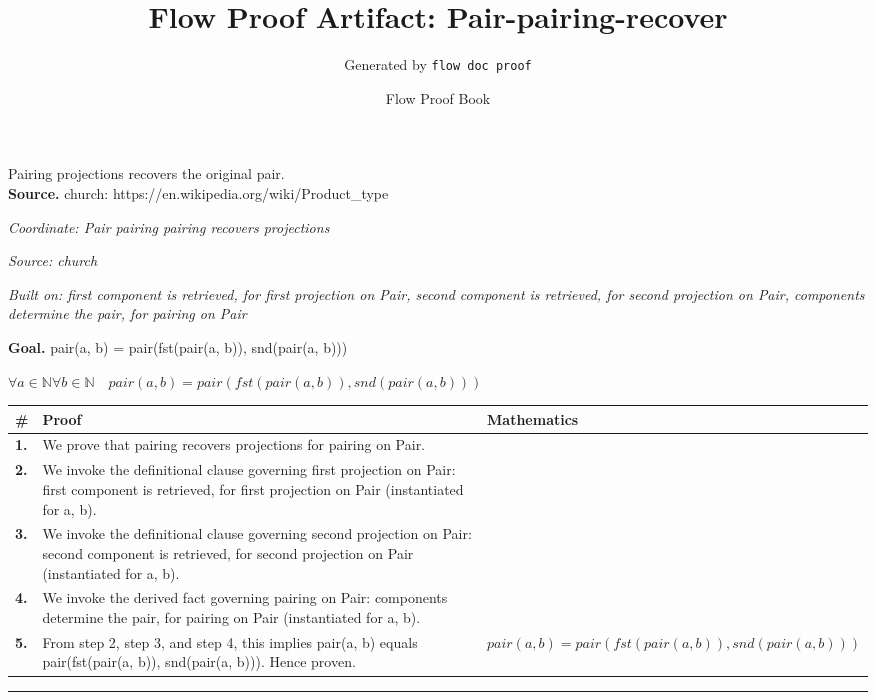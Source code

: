 \documentclass[11pt]{article}
\title{Flow Proof Artifact: Pair-pairing-recover}
\author{Generated by \texttt{flow doc proof}}
\date{Flow Proof Book}
\theoremstyle{definition}
\begin{document}
\maketitle
Pairing projections recovers the original pair.\\[0.5em]
\textbf{Source.} church: https://en.wikipedia.org/wiki/Product\_type\\[0.5em]
\bigskip
{}\par
\smallskip\noindent\textit{Coordinate: Pair \cdot pairing \cdot pairing recovers projections}\par
\smallskip\noindent\textit{Source: church}\par
\smallskip\noindent\textit{Built on: first component is retrieved, for first projection on Pair, second component is retrieved, for second projection on Pair, components determine the pair, for pairing on Pair}\par
\medskip
\noindent\textbf{Goal.} pair(a, b) = pair(fst(pair(a, b)), snd(pair(a, b)))\par
\noindent$\displaystyle \forall a \in \mathbb{N} \forall b \in \mathbb{N}\quad pair(a, b) = pair(fst(pair(a, b)), snd(pair(a, b)))$\par
\medskip
\noindent
\begin{tabular}{@{} >{\raggedright\arraybackslash}p{} >{\raggedright\arraybackslash}p{} >{\raggedleft\arraybackslash}p{} @{}}
\textbf{\#} & \textbf{Proof} & \textbf{Mathematics} \\
\midrule
\textbf{1.} & We prove that pairing recovers projections for pairing on Pair. & \\[0.45em]
\textbf{2.} & We invoke the definitional clause governing first projection on Pair: first component is retrieved, for first projection on Pair (instantiated for a, b). & \\[0.45em]
\textbf{3.} & We invoke the definitional clause governing second projection on Pair: second component is retrieved, for second projection on Pair (instantiated for a, b). & \\[0.45em]
\textbf{4.} & We invoke the derived fact governing pairing on Pair: components determine the pair, for pairing on Pair (instantiated for a, b). & \\[0.45em]
\textbf{5.} & From step 2, step 3, and step 4, this implies pair(a, b) equals pair(fst(pair(a, b)), snd(pair(a, b))). Hence proven. & $\displaystyle pair(a, b) = pair(fst(pair(a, b)), snd(pair(a, b)))$ \\[0.45em]
\bottomrule
\end{tabular}
\label{thm:Pair-pairing-pairing_recovers_projections}
\par\medskip\hrule
\end{document}

